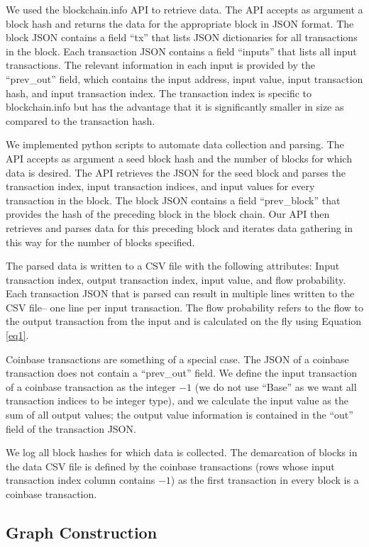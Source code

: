 \documentclass[letterpaper, 10 pt, conference]{ieeeconf}  %
\begin{document}
We used the blockchain.info API to retrieve data. The API accepts as argument a block hash and returns the data for the appropriate block in JSON format. The block JSON contains a field ``tx'' that lists JSON dictionaries for all transactions in the block. Each transaction JSON contains a field ``inputs'' that lists all input transactions. The relevant information in each input is provided by the ``prev\_out'' field, which contains the input address, input value, input transaction hash, and input transaction index. The transaction index is specific to blockchain.info but has the advantage that it is significantly smaller in size as compared to the transaction hash.

We implemented python scripts to automate data collection and parsing. The API accepts as argument a seed block hash and the number of blocks for which data is desired. The API retrieves the JSON for the seed block and parses the transaction index, input transaction indices, and input values for every transaction in the block. The block JSON contains a field ``prev\_block'' that provides the hash of the preceding block in the block chain. Our API then retrieves and parses data for this preceding block and iterates data gathering in this way for the number of blocks specified.

The parsed data is written to a CSV file with the following attributes: Input transaction index, output transaction index, input value, and flow probability. Each transaction JSON that is parsed can result in multiple lines written to the CSV file-- one line per input transaction. The flow probability refers to the flow to the output transaction from the input and is calculated on the fly using Equation \ref{eq1}.

Coinbase transactions are something of a special case. The JSON of a coinbase transaction does not contain a ``prev\_out'' field. We define the input transaction of a coinbase transaction as the integer $-1$ (we do not use ``Base'' as we want all transaction indices to be integer type), and we calculate the input value as the sum of all output values; the output value information is contained in the ``out'' field of the transaction JSON.

We log all block hashes for which data is collected. The demarcation of blocks in the data CSV file is defined by the coinbase transactions (rows whose input transaction index column contains $-1$) as the first transaction in every block is a coinbase transaction.


\subsection{Graph Construction}
\end{document}
